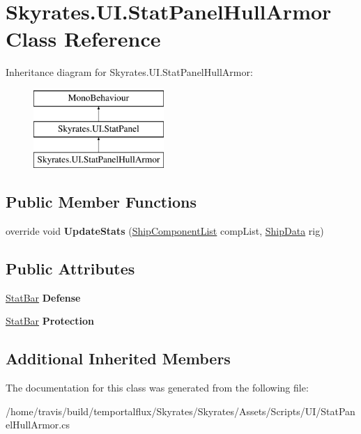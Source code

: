 \hypertarget{class_skyrates_1_1_u_i_1_1_stat_panel_hull_armor}{\section{Skyrates.\-U\-I.\-Stat\-Panel\-Hull\-Armor Class Reference}
\label{class_skyrates_1_1_u_i_1_1_stat_panel_hull_armor}
}
Inheritance diagram for Skyrates.\-U\-I.\-Stat\-Panel\-Hull\-Armor\-:\begin{figure}[H]
\begin{center}
\leavevmode
\includegraphics[height=3.000000cm]{class_skyrates_1_1_u_i_1_1_stat_panel_hull_armor}
\end{center}
\end{figure}
\subsection*{Public Member Functions}
\begin{DoxyCompactItemize}
\item 
\hypertarget{class_skyrates_1_1_u_i_1_1_stat_panel_hull_armor_ad947a1387e882233b068e4a577cc7558}{override void {\bfseries Update\-Stats} (\hyperlink{class_skyrates_1_1_ship_1_1_ship_component_list}{Ship\-Component\-List} comp\-List, \hyperlink{class_skyrates_1_1_ship_1_1_ship_data}{Ship\-Data} rig)}\label{class_skyrates_1_1_u_i_1_1_stat_panel_hull_armor_ad947a1387e882233b068e4a577cc7558}

\end{DoxyCompactItemize}
\subsection*{Public Attributes}
\begin{DoxyCompactItemize}
\item 
\hypertarget{class_skyrates_1_1_u_i_1_1_stat_panel_hull_armor_abba696bfb858c1aaba49f033d1c439f6}{\hyperlink{class_skyrates_1_1_u_i_1_1_stat_bar}{Stat\-Bar} {\bfseries Defense}}\label{class_skyrates_1_1_u_i_1_1_stat_panel_hull_armor_abba696bfb858c1aaba49f033d1c439f6}

\item 
\hypertarget{class_skyrates_1_1_u_i_1_1_stat_panel_hull_armor_a120ed9c4913dbd25633195e1892e721f}{\hyperlink{class_skyrates_1_1_u_i_1_1_stat_bar}{Stat\-Bar} {\bfseries Protection}}\label{class_skyrates_1_1_u_i_1_1_stat_panel_hull_armor_a120ed9c4913dbd25633195e1892e721f}

\end{DoxyCompactItemize}
\subsection*{Additional Inherited Members}


The documentation for this class was generated from the following file\-:\begin{DoxyCompactItemize}
\item 
/home/travis/build/temportalflux/\-Skyrates/\-Skyrates/\-Assets/\-Scripts/\-U\-I/Stat\-Panel\-Hull\-Armor.\-cs\end{DoxyCompactItemize}
